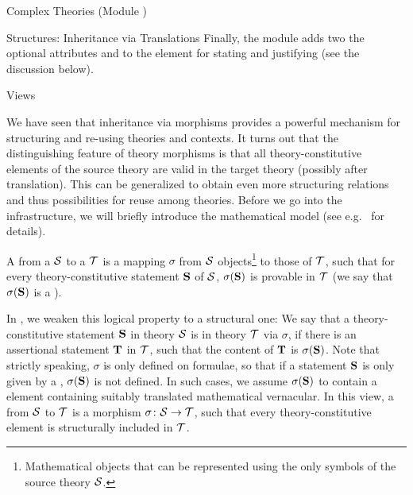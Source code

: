 \begin{tchapter}[id=complex-theories,short=Complex Theories]{Complex Theories (Module
    )}
\begin{tsection}[id=morphisms]{Structures: Inheritance via Translations}
Finally, the  module adds two the optional attributes
 and  to
the  element for stating and justifying 
(see the discussion below).
\end{tsection}

\begin{tsection}[id=views]{Views}
  
  We have seen that inheritance via morphisms provides a powerful mechanism for
  structuring and re-using theories and contexts. It turns out that the distinguishing
  feature of theory morphisms is that all theory-constitutive elements of the source
  theory are valid in the target theory (possibly after translation). This can be
  generalized to obtain even more structuring relations and thus possibilities for reuse
  among theories. Before we go into the \omdoc infrastructure, we will briefly introduce
  the mathematical model (see e.g.~\cite{Hutter:mocsv00} for details).

  A  from a  ${\cal S}$ to a  ${\cal T}$
  is a mapping $\sigma$ from ${\cal S}$ objects\footnote{Mathematical objects that can be
    represented using the only symbols of the source theory ${\cal S}$.} to those of ${\cal T}$,
  such that for every theory-constitutive statement ${\bf S}$ of ${\cal S}$, $\sigma({\bf S})$ is
  provable in ${\cal T}$ (we say that $\sigma({\bf S})$ is a ).
   
  In \omdoc, we weaken this logical property to a structural one: We say that a
  theory-constitutive statement ${\bf S}$ in theory ${\cal S}$ is
   in theory ${\cal T}$ via $\sigma$, if there is an
  assertional statement ${\bf T}$ in ${\cal T}$, such that the content
  of ${\bf T}$ is $\sigma({\bf S})$.  Note that strictly speaking, $\sigma$ is only defined on
  formulae, so that if a statement ${\bf S}$ is only given by a , $\sigma({\bf S})$
  is not defined. In such cases, we assume $\sigma({\bf S})$ to contain a 
  element containing suitably translated mathematical vernacular. In this view, a
   from ${\cal S}$ to ${\cal T}$ is a morphism
  $\sigma\colon{\cal S}\to{\cal T}$, such that every theory-constitutive element is structurally
  included in ${\cal T}$.
  

\end{tsection}
\end{tchapter}
